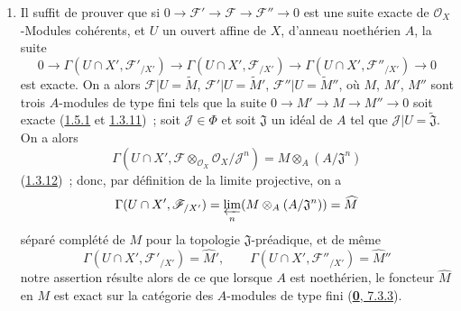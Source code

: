 \medskip\noindent
\begin{enumerate}
  \item[\rm{(i)}] Il suffit de prouver que si
    $0\to\mathscr{F}'\to\mathscr{F}\to\mathscr{F}''\to0$ est une suite
    exacte de $\mathscr{O}_X$-Modules cohérents, et $U$ un ouvert affine
    de $X$, d'anneau noethérien $A$, la suite
    \[
      0\to\Gamma(U\cap X',\mathscr{F}'_{/X'})
      \to\Gamma(U\cap X',\mathscr{F}_{/X'})
      \to\Gamma(U\cap X',\mathscr{F}''_{/X'})\to0
    \]
    est exacte. On a alors $\mathscr{F}|U=\widetilde M$,
    $\mathscr{F}'|U=\widetilde{M}'$, $\mathscr{F}''|U=\widetilde{M}''$,
    où $M$, $M'$, $M''$ sont trois $A$-modules de type fini tels que la
    suite $0\to M'\to M\to M''\to0$ soit exacte
    (\hyperref[I.1.5.1-fr]{1.5.1} et
    \hyperref[I.1.3.11-fr]{1.3.11})~; soit $\mathscr{J}\in\Phi$ et soit
    $\mathfrak{J}$ un idéal de $A$ tel que
    $\mathscr{J}|U=\widetilde{\mathfrak{J}}$. On a alors
    \[
      \Gamma(U\cap X',
      \mathscr{F}\otimes_{\mathscr{O}_X}\mathscr{O}_X/\mathscr{J}^n)
      =M\otimes_A(A/\mathfrak{J}^n)
    \]
    (\hyperref[I.1.3.12-fr]{1.3.12})~; donc, par définition de la limite
    projective, on a
    \[
      \Gamma(U\cap X',\mathscr{F}_{/X'})
      =\varprojlim_n(M\otimes_A(A/\mathfrak{J}^n))=\widehat M
    \]
    séparé complété de $M$ pour la topologie $\mathfrak{J}$-préadique, et
    de même
    \[
      \Gamma(U\cap X',\mathscr{F}'_{/X'})=\widehat{M}',\qquad
      \Gamma(U\cap X',\mathscr{F}''_{/X'})=\widehat{M}''
    \]
    notre assertion résulte alors de ce que lorsque $A$ est noethérien,
    le foncteur $\widehat M$ en $M$ est exact sur la catégorie des
    $A$-modules de type fini (\hyperref[0.7.3.3-fr]{\textbf{0}, 7.3.3}).


\end{enumerate}
